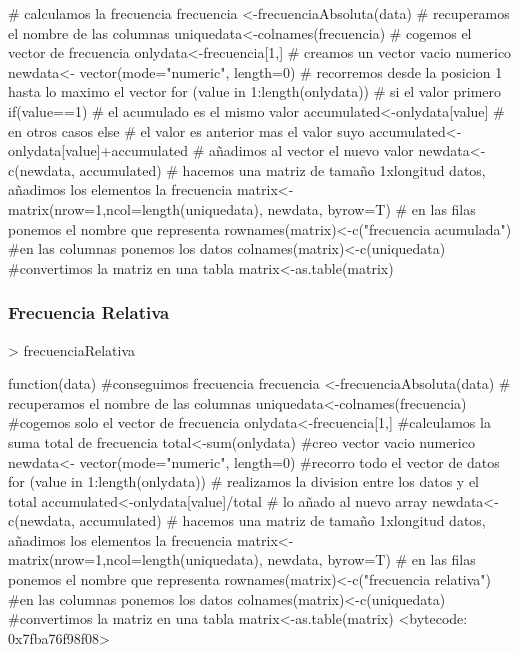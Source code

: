 \documentclass [a4paper] {article}
\begin{document}
\begin{center}
\begin{Schunk}
\begin{Soutput}
{    # calculamos la frecuencia
    frecuencia <-frecuenciaAbsoluta(data)
    # recuperamos el nombre de las columnas
    uniquedata<-colnames(frecuencia)
    # cogemos el vector de frecuencia
    onlydata<-frecuencia[1,]
    # creamos un vector vacio numerico
    newdata<- vector(mode="numeric", length=0)
    # recorremos desde la posicion 1 hasta lo maximo el vector
    for (value in 1:length(onlydata)) {
        # si el valor primero
        if(value==1){   
            # el acumulado es el mismo valor
            accumulated<-onlydata[value]
        # en otros casos
        }else{
            # el valor es anterior mas el valor suyo
            accumulated<-onlydata[value]+accumulated
        }
        # añadimos al vector el nuevo valor
        newdata<-c(newdata, accumulated)
    }
    # hacemos una matriz de tamaño 1xlongitud datos, añadimos los elementos la frecuencia
    matrix<-matrix(nrow=1,ncol=length(uniquedata), newdata, byrow=T)
    # en las filas ponemos el nombre que representa
    rownames(matrix)<-c("frecuencia acumulada")
    #en las columnas ponemos los datos
    colnames(matrix)<-c(uniquedata)
    #convertimos la matriz en una tabla
    matrix<-as.table(matrix)
}
\end{Soutput}
\end{Schunk}
\subsubsection{Frecuencia Relativa}
\begin{Schunk}
\begin{Sinput}
> frecuenciaRelativa
\end{Sinput}
\begin{Soutput}
function(data){
    #conseguimos frecuencia
    frecuencia <-frecuenciaAbsoluta(data)
    # recuperamos el nombre de las columnas
    uniquedata<-colnames(frecuencia)
    #cogemos solo el vector de frecuencia
    onlydata<-frecuencia[1,]
    #calculamos la suma total de frecuencia
    total<-sum(onlydata)
    #creo vector vacio numerico
    newdata<- vector(mode="numeric", length=0)
    #recorro todo el vector de datos
    for (value in 1:length(onlydata)) {
        # realizamos la division entre los datos y el total
        accumulated<-onlydata[value]/total
        # lo añado al nuevo array
        newdata<-c(newdata, accumulated)
    }
    # hacemos una matriz de tamaño 1xlongitud datos, añadimos los elementos la frecuencia
  matrix<-matrix(nrow=1,ncol=length(uniquedata), newdata, byrow=T)
  # en las filas ponemos el nombre que representa
  rownames(matrix)<-c("frecuencia relativa")
  #en las columnas ponemos los datos
  colnames(matrix)<-c(uniquedata)
  #convertimos la matriz en una tabla
  matrix<-as.table(matrix)
}
<bytecode: 0x7fba76f98f08>
\end{Soutput}
\end{Schunk}

\end{center}
\end{document}
